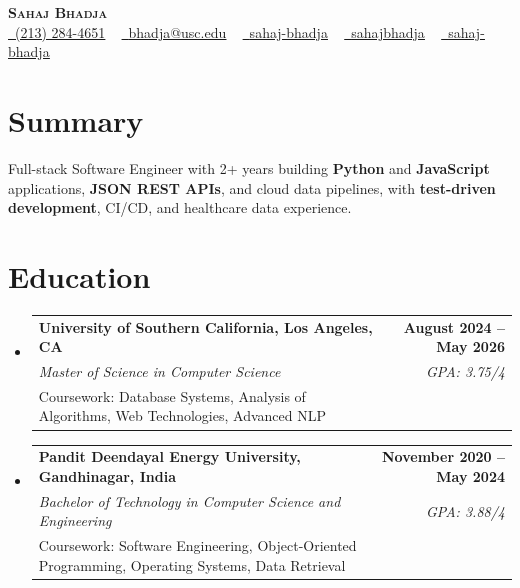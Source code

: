 \documentclass[letterpaper,10pt]{article}
\makeatletter
\newcommand{\sectionGap}{\vspace{-8pt}}
\newcommand{\resumeEduSubheading}[5]{\vspace{-1pt}\item\begin{tabular*}{1.0\textwidth}[t]{l@{\extracolsep{\fill}}r}\textbf{#1} & \textbf{\small #2} \\\textit{\small #3} & \textit{\small #4} \\\small #5 & \\\end{tabular*}\vspace{-4pt}}
\newcommand{\resumeSubHeadingListStart}{\begin{itemize}[leftmargin=0.0in, label={}]}
\newcommand{\resumeSubHeadingListEnd}{\end{itemize}}
\makeatother
\begin{document}
\begin{center}
{\Huge \scshape \textbf{Sahaj Bhadja}} \\ \vspace{1pt}
\small \href{tel:2132844651}{\faPhone\ \underline{(213) 284-4651}} ~ \href{mailto:bhadja@usc.edu}{\raisebox{-0.2\height}\faEnvelope\ \underline{bhadja@usc.edu}} ~
\href{https://www.linkedin.com/in/sahaj-bhadja/}{\raisebox{-0.2\height}\faLinkedin\ \underline{sahaj-bhadja}} ~ \href{https://github.com/SAHAJ-BHADJA}{\raisebox{-0.2\height}\faGithub\ \underline{sahajbhadja}} ~
\href{https://sahaj-bhadja.vercel.app/}{\raisebox{-0.2\height}\faGlobe\ \underline{sahaj-bhadja}}
\end{center}
\vspace{-16pt}
\section{Summary}
\begin{itemize}[leftmargin=0.15in, label={}]
\small{\item{Full-stack Software Engineer with 2+ years building \textbf{Python} and \textbf{JavaScript} applications, \textbf{JSON REST APIs}, and cloud data pipelines, with \textbf{test-driven development}, CI/CD, and healthcare data experience.}}
\end{itemize}
\sectionGap
\section{Education}
\resumeSubHeadingListStart
\resumeEduSubheading{University of Southern California, Los Angeles, CA}{August 2024 -- May 2026}{Master of Science in Computer Science}{GPA: 3.75/4}{Coursework: Database Systems, Analysis of Algorithms, Web Technologies, Advanced NLP}
\resumeEduSubheading{Pandit Deendayal Energy University, Gandhinagar, India}{November 2020 -- May 2024}{Bachelor of Technology in Computer Science and Engineering}{GPA: 3.88/4}{Coursework: Software Engineering, Object-Oriented Programming, Operating Systems, Data Retrieval}
\resumeSubHeadingListEnd
\sectionGap
\end{document}
